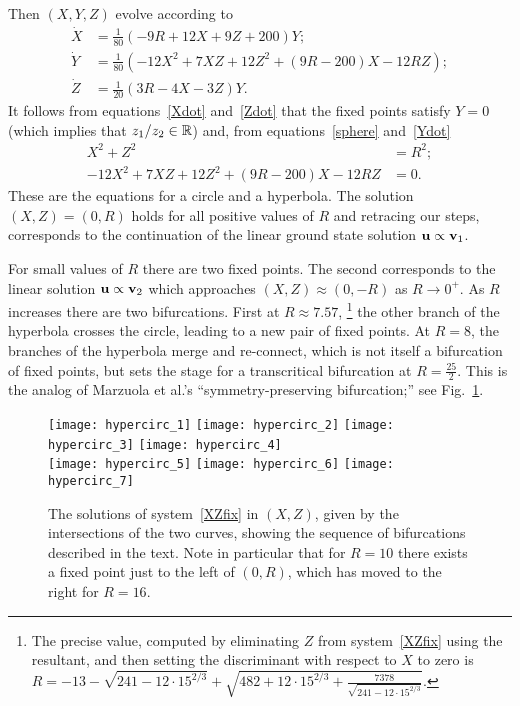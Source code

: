 \documentclass{article}
\numberwithin{equation}{section}
\numberwithin{figure}{section}
\begin{document}
Then $(X,Y,Z)$ evolve according to 
\begin{subequations}
\label{XYZdot}
\begin{align}
\dot X & = \frac{1}{80}  (-9 R+12 X+9 Z+200) Y;\label{Xdot} \\
\dot Y & = \frac{1}{80} \left(-12 X^2 + 7 X Z + 12 Z^2 +(9 R -200) X-12 R Z \right);\label{Ydot} \\
\dot Z & = \frac{1}{20}  (3 R-4 X-3 Z) Y.\label{Zdot}
\end{align}
\end{subequations}
It follows from equations~\eqref{Xdot} and~\eqref{Zdot} that the fixed points  satisfy $Y=0$ (which implies that $z_1/z_2 \in \mathbb{R}$) and, from equations~\eqref{sphere} and~\eqref{Ydot}
\begin{subequations}
\label{XZfix}
\begin{align}
X^2 + Z^2 & = R^2; \\
-12 X^2 + 7 X Z + 12 Z^2 +(9 R -200) X-12 R Z  & =0.
\end{align}
\end{subequations}
These are the equations for a circle and a hyperbola. The solution $(X,Z)=(0,R)$ holds for all positive values of $R$ and retracing our steps, corresponds to the continuation of the linear ground state solution $\mathbf{u} \propto \mathbf{v}_1$.

For small values of $R$ there are two fixed points. The second corresponds to the linear solution $\mathbf{u} \propto \mathbf{v}_2$ which approaches $(X,Z) \approx (0,-R)$ as $R \to 0^+$. As $R$ increases there are two bifurcations. First at $R \approx 7.57$,%
\footnote{The precise value, computed by eliminating $Z$ from system~\eqref{XZfix} using the resultant, and then setting the discriminant with respect to $X$ to zero is $R=-13-\sqrt{241-12 \cdot 15^{2/3}}+\sqrt{482+12 \cdot 15^{2/3}+\tfrac{7378}{\sqrt{241-12 \cdot 15^{2/3}}}}$.}
 the other branch of the hyperbola crosses the circle, leading to a new pair of fixed points. At $R=8$, the branches of the hyperbola merge and re-connect, which is not itself a bifurcation of fixed points, but sets the stage for a transcritical bifurcation at $R=\tfrac{25}{2}$. This is the analog of Marzuola et al.'s ``symmetry-preserving bifurcation;'' see Fig.~\ref{fig:hypercirc}.
 \begin{figure}[htbp] %
    \centering
    \texttt{[image: hypercirc\_1]}
    \texttt{[image: hypercirc\_2]}
    \texttt{[image: hypercirc\_3]}
    \texttt{[image: hypercirc\_4]}\\
    \texttt{[image: hypercirc\_5]}
    \texttt{[image: hypercirc\_6]}
    \texttt{[image: hypercirc\_7]}
    \caption{The solutions of system~\eqref{XZfix} in $(X,Z)$, given by the intersections of the two curves, showing the sequence of bifurcations described in the text. Note in particular that for $R=10$ there exists a fixed point just to the left of $(0,R)$, which has moved to the right for $R=16$.}
\label{fig:hypercirc}
 \end{figure}
\end{document}

